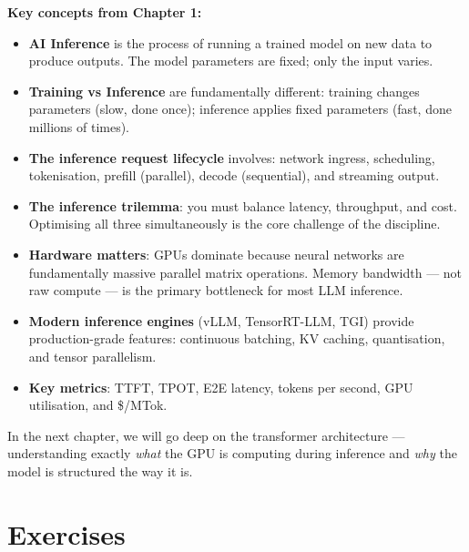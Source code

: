 \documentclass[12pt, twoside, openright]{book}
\newenvironment{chapsummary}{%
  \begin{tcolorbox}[
    enhanced, breakable,
    colback=chaptercolor!5, colframe=chaptercolor,
    title={\bfseries\color{white} Chapter Summary},
    coltitle=white, colbacktitle=chaptercolor,
    arc=4pt, left=8pt, right=8pt, top=6pt, bottom=6pt,
  ]
}{%
  \end{tcolorbox}
}
\begin{document}
\begin{chapsummary}
\textbf{Key concepts from Chapter 1:}

\begin{itemize}
  \item \textbf{AI Inference} is the process of running a trained model
        on new data to produce outputs. The model parameters are fixed;
        only the input varies.

  \item \textbf{Training vs Inference} are fundamentally different:
        training changes parameters (slow, done once);
        inference applies fixed parameters (fast, done millions of times).

  \item \textbf{The inference request lifecycle} involves: network
        ingress, scheduling, tokenisation, prefill (parallel),
        decode (sequential), and streaming output.

  \item \textbf{The inference trilemma}: you must balance latency,
        throughput, and cost. Optimising all three simultaneously
        is the core challenge of the discipline.

  \item \textbf{Hardware matters}: GPUs dominate because neural networks
        are fundamentally massive parallel matrix operations.
        Memory bandwidth --- not raw compute --- is the primary
        bottleneck for most LLM inference.

  \item \textbf{Modern inference engines} (vLLM, TensorRT-LLM, TGI)
        provide production-grade features: continuous batching,
        KV caching, quantisation, and tensor parallelism.

  \item \textbf{Key metrics}: TTFT, TPOT, E2E latency, tokens per
        second, GPU utilisation, and \$/MTok.
\end{itemize}

\vspace{6pt}
In the next chapter, we will go deep on the transformer architecture ---
understanding exactly \textit{what} the GPU is computing during inference
and \textit{why} the model is structured the way it is.
\end{chapsummary}

\section{Exercises}
\end{document}
